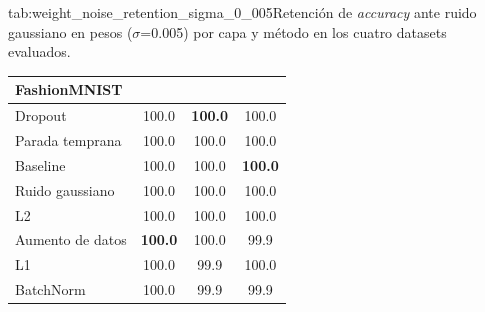 \begin{table}{tab:weight_noise_retention_sigma_0_005}{Retención de \textit{accuracy} ante ruido gaussiano en pesos ($\sigma$=0.005) por capa y método en los cuatro datasets evaluados.}
\begin{tabular}{lccc}
\midrule
\multicolumn{4}{l}{\textbf{FashionMNIST}}\\
\midrule
Dropout & 100.0 & \textbf{100.0} & 100.0 \\
Parada temprana & 100.0 & 100.0 & 100.0 \\
Baseline & 100.0 & 100.0 & \textbf{100.0} \\
Ruido gaussiano & 100.0 & 100.0 & 100.0 \\
L2 & 100.0 & 100.0 & 100.0 \\
Aumento de datos & \textbf{100.0} & 100.0 & 99.9 \\
L1 & 100.0 & 99.9 & 100.0 \\
BatchNorm & 100.0 & 99.9 & 99.9 \\
\bottomrule
\end{tabular}
\end{table}